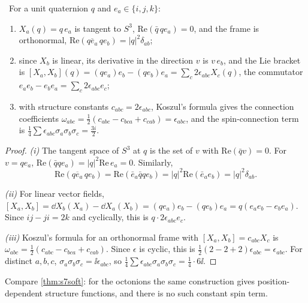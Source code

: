 \begin{proposition}\label{prop:qframe}\ver\
For a unit quaternion $q$ and $e_a\in\{i,j,k\}$:
\begin{enumerate}[label=(\roman*)]
\item $X_a(q)=q\,e_a$ is tangent to $S^3$, $\mathrm{Re}(\bar q\,q e_a)=0$, and the frame is orthonormal, $\mathrm{Re}(\overline{qe_a}\,qe_b)=|q|^2\delta_{ab}$;
\item since $X_b$ is linear, its derivative in the direction $v$ is $v\,e_b$, and the Lie bracket is $[X_a,X_b](q)=(qe_a)e_b-(qe_b)e_a=\sum_c2\epsilon_{abc}X_c(q)$, the commutator $e_ae_b-e_be_a=\sum_c2\epsilon_{abc}e_c$;
\item with structure constants $c_{abc}=2\epsilon_{abc}$, Koszul's formula gives the connection coefficients $\omega_{abc}=\frac12(c_{abc}-c_{bca}+c_{cab})=\epsilon_{abc}$, and the spin-connection term is $\frac14\sum\epsilon_{abc}\sigma_a\sigma_b\sigma_c=\frac{3i}2$.
\end{enumerate}
\end{proposition}
\begin{proof}
\emph{(i)} The tangent space of $S^3$ at $q$ is the set of $v$ with $\mathrm{Re}(\bar qv)=0$. For $v=qe_a$, $\mathrm{Re}(\bar qqe_a)=|q|^2\mathrm{Re}\,e_a=0$. Similarly,
\[
\mathrm{Re}(\overline{qe_a}\,qe_b)=\mathrm{Re}(\bar e_a\bar qqe_b)=|q|^2\mathrm{Re}(\bar e_ae_b)=|q|^2\delta_{ab}.
\]

\emph{(ii)} For linear vector fields, $[X_a,X_b]=\dd X_b(X_a)-\dd X_a(X_b)=(qe_a)e_b-(qe_b)e_a=q(e_ae_b-e_be_a)$. Since $ij-ji=2k$ and cyclically, this is $q\cdot2\epsilon_{abc}e_c$.

\emph{(iii)} Koszul's formula for an orthonormal frame with $[X_a,X_b]=c_{abc}X_c$ is $\omega_{abc}=\frac12(c_{abc}-c_{bca}+c_{cab})$. Since $\epsilon$ is cyclic, this is $\frac12(2-2+2)\epsilon_{abc}=\epsilon_{abc}$. For distinct $a,b,c$, $\sigma_a\sigma_b\sigma_c=\ii\epsilon_{abc}$, so $\frac14\sum\epsilon_{abc}\sigma_a\sigma_b\sigma_c=\frac14\cdot6\ii$.
\end{proof}


Compare \cref{thm:s7soft}: for the octonions the same construction gives position-dependent structure functions, and there is no such constant spin term.

